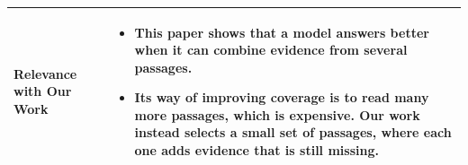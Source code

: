 \documentclass[12pt,a4paper]{report}
\begin{document}
\begin{longtable}{|p{1.25in}|p{5.15in}|}
\textbf{Relevance with Our Work} &
\begin{itemize}[leftmargin=0.18in,itemsep=0.05in,topsep=0pt,parsep=0pt]
\item This paper shows that a model answers better when it can combine evidence from several passages.
\item Its way of improving coverage is to read many more passages, which is expensive. Our work instead selects a small set of passages, where each one adds evidence that is still missing.
\end{itemize} \\ \hline
\end{longtable}
\clearpage


\end{document}
